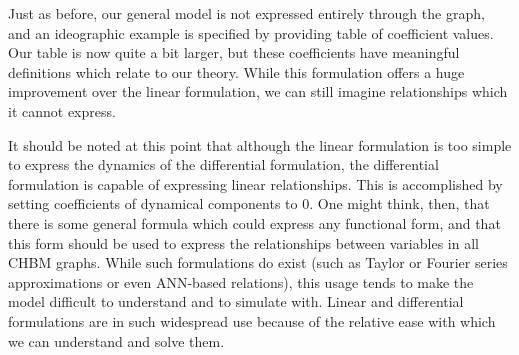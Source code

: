\documentclass[runningheads,a4paper]{llncs}
\begin{document}
Just as before, our general model is not expressed entirely through the graph, and an  ideographic example is specified by providing table of coefficient values.
Our table is now quite a bit larger, but these coefficients have meaningful definitions which relate to our theory.
While this formulation offers a huge improvement over the linear formulation, we can still imagine relationships which it cannot express.

It should be noted at this point that although the linear formulation is too simple to express the dynamics of the differential formulation, the differential formulation is capable of expressing linear relationships.
This is accomplished by setting coefficients of dynamical components to 0.
One might think, then, that there is some general formula which could express any functional form, and that this form should be used to express the relationships between variables in all CHBM graphs.
While such formulations do exist (such as Taylor or Fourier series approximations or even ANN-based relations), this usage tends to make the model difficult to understand and to simulate with.
Linear and differential formulations are in such widespread use because of the relative ease with which we can understand and solve them. 
\end{document}
